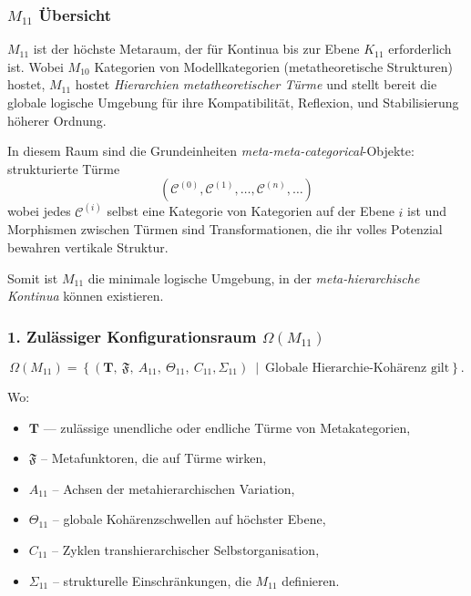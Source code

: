 

\subsubsection{$M_{11}$ Übersicht}
\label{sec:m11-overview}

$M_{11}$ ist der höchste Metaraum, der für Kontinua bis zur Ebene $K_{11}$ erforderlich ist.
Wobei $M_{10}$ Kategorien von Modellkategorien (metatheoretische Strukturen) hostet,
$M_{11}$ hostet \emph{Hierarchien metatheoretischer Türme} und stellt bereit
die globale logische Umgebung für ihre Kompatibilität, Reflexion,
und Stabilisierung höherer Ordnung.

In diesem Raum sind die Grundeinheiten \emph{meta-meta-categorical}-Objekte:
strukturierte Türme
\[
(\mathcal{C}^{(0)}, \mathcal{C}^{(1)}, \ldots, \mathcal{C}^{(n)}, \ldots)
\]
wobei jedes $\mathcal{C}^{(i)}$ selbst eine Kategorie von Kategorien auf der Ebene $i$ ist
und Morphismen zwischen Türmen sind Transformationen, die ihr volles Potenzial bewahren
vertikale Struktur.

Somit ist $M_{11}$ die minimale logische Umgebung, in der
\emph{meta-hierarchische Kontinua} können existieren.

\subsubsection*{1. Zulässiger Konfigurationsraum $\Omega(M_{11})$}

\[
\Omega(M_{11}) =
\left\{
\left( \mathbf{T},\ \mathfrak{F},\ A_{11},\
\Theta_{11},\ C_{11},\Sigma_{11} \right)
\ \middle|\
\text{Globale Hierarchie-Kohärenz gilt}
\right\}.
\]

Wo:

\begin{itemize}
    \item $\mathbf{T}$ — zulässige unendliche oder endliche Türme von Metakategorien,
    \item $\mathfrak{F}$ – Metafunktoren, die auf Türme wirken,
    \item $A_{11}$ – Achsen der metahierarchischen Variation,
    \item $\Theta_{11}$ – globale Kohärenzschwellen auf höchster Ebene,
    \item $C_{11}$ – Zyklen transhierarchischer Selbstorganisation,
    \item $\Sigma_{11}$ – strukturelle Einschränkungen, die $M_{11}$ definieren.
\end{itemize}

